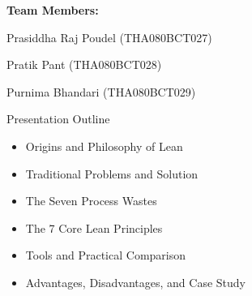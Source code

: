 \documentclass{thapathali}
\subtitle{\ProjectSubtitle}
\author[\studentone]{\studentone, \studenttwo, \studentthree}
\institute[\DepartmentName]{\DepartmentName}
\date[\PresentationDate]{\PresentationDate}
\newcommand{\studentone}{Prasiddha Raj Poudel}
\newcommand{\rollone}{THA080BCT027}
\newcommand{\studenttwo}{Pratik Pant}
\newcommand{\rolltwo}{THA080BCT028}
\newcommand{\studentthree}{Purnima Bhandari}
\newcommand{\rollthree}{THA080BCT029}
\begin{document}
\begin{frame}[plain]
    \begin{center}
        \vspace{0.8cm}
        {\Large \bfseries \ProjectTitle \par}
        \vspace{1.5em}
        {\normalsize \bfseries Team Members:\par}
        \vspace{0.3em}
        {\small \studentone{} (\rollone)\par}
        {\small \studenttwo{} (\rolltwo)\par}
        {\small \studentthree{} (\rollthree)\par}
        \vfill
        {\normalsize \DepartmentName\par}
        {\normalsize \InstitutionName\par}
        \vspace{0.3em}
        {\normalsize \PresentationDate\par}
    \end{center}
\end{frame}

\begin{frame}{Presentation Outline}
    \begin{itemize}
        \item Origins and Philosophy of Lean
        \item Traditional Problems and Solution
        \item The Seven Process Wastes
        \item The 7 Core Lean Principles
        \item Tools and Practical Comparison
        \item Advantages, Disadvantages, and Case Study
    \end{itemize}
\end{frame}

\end{document}
